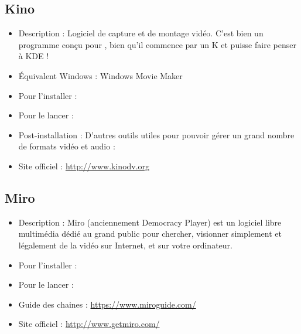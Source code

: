 \subsection{Kino}
\begin{itemize}
\begingroup
{}
\item Description : Logiciel de capture et de montage vidéo. C'est bien un programme conçu pour , bien qu'il commence par un K et puisse faire penser à KDE !{\par}
\endgroup
\item Équivalent Windows : Windows Movie Maker{\par}
\item Pour l'installer : 
\item Pour le lancer : 
\item Post-installation : D'autres outils utiles pour pouvoir gérer un grand nombre de formats vidéo et audio : 
\item Site officiel : \url{http://www.kinodv.org}{\par}
\end{itemize}


\subsection{Miro}
\begin{itemize}
\begingroup
{}
\item Description : Miro (anciennement Democracy Player) est un logiciel libre multimédia dédié au grand public pour chercher, visionner simplement et légalement de la vidéo sur Internet, et sur votre ordinateur.{\par}
\item Pour l'installer : 
\item Pour le lancer : 
\item Guide des chaines : \url{https://www.miroguide.com/}{\par}
\item Site officiel : \url{http://www.getmiro.com/}{\par}
\endgroup
\end{itemize}

